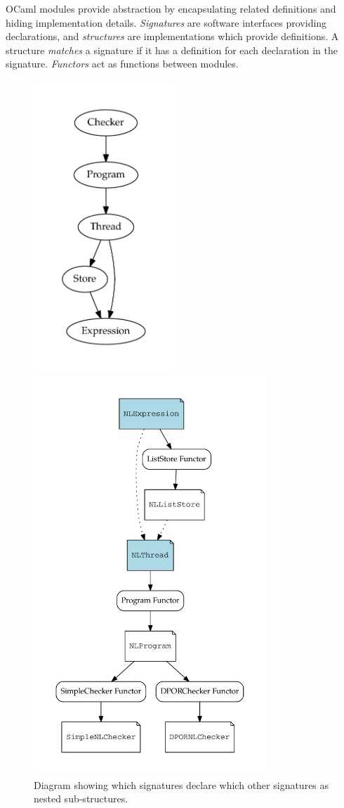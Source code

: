 \documentclass[12pt,a4paper,twoside,openany]{report}
\begin{document}
OCaml modules
provide abstraction by encapsulating
related definitions and hiding implementation details.
\emph{Signatures} are software interfaces
providing declarations,
and \emph{structures} are implementations which 
provide definitions. A structure \emph{matches} a
signature if it has a definition for each declaration
in the signature. \emph{Functors} act as
functions between modules.

\begin{figure}
	\centering
	\begin{minipage}{.47\textwidth}
		\centering
		\includegraphics[height=11cm]{interfaces}
		\caption{Diagram showing which signatures declare
			which other signatures as nested sub-structures.}
		\label{fig:interfaces}
	\end{minipage}%
	\qquad
	\begin{minipage}{.47\textwidth}
		\centering
		\includegraphics[height=15cm]{functors}

\end{minipage}
\end{figure}
\end{document}

